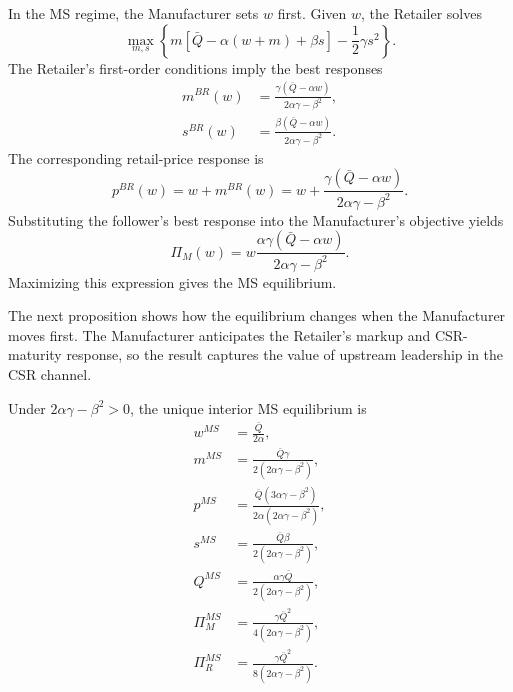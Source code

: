 In the MS regime, the Manufacturer sets $w$ first. Given $w$, the Retailer solves
\begin{equation*}
    \max_{m,s}\left\{m\left[\bar{Q}-\alpha(w+m)+\beta s\right]-\frac12\gamma s^2\right\}.
\end{equation*}
The Retailer's first-order conditions imply the best responses
\begin{align*}
    m^{BR}(w)&=\frac{\gamma(\bar{Q}-\alpha w)}{2\alpha\gamma-\beta^2},\\
    s^{BR}(w)&=\frac{\beta(\bar{Q}-\alpha w)}{2\alpha\gamma-\beta^2}.
\end{align*}
The corresponding retail-price response is
\begin{equation*}
    p^{BR}(w)=w+m^{BR}(w)
    =w+\frac{\gamma(\bar{Q}-\alpha w)}{2\alpha\gamma-\beta^2}.
\end{equation*}
Substituting the follower's best response into the Manufacturer's objective yields
\begin{equation*}
    \Pi_M(w)=w\frac{\alpha\gamma(\bar{Q}-\alpha w)}{2\alpha\gamma-\beta^2}.
\end{equation*}
Maximizing this expression gives the MS equilibrium.

The next proposition shows how the equilibrium changes when the Manufacturer moves first. The Manufacturer anticipates the Retailer's markup and CSR-maturity response, so the result captures the value of upstream leadership in the CSR channel.

\begin{proposition}
\label{prop:ms}
Under $2\alpha\gamma-\beta^2>0$, the unique interior MS equilibrium is
\begin{align*}
    w^{MS} &= \frac{\bar{Q}}{2\alpha},\\
    m^{MS} &= \frac{\bar{Q}\gamma}{2(2\alpha\gamma-\beta^2)},\\
    p^{MS} &= \frac{\bar{Q}(3\alpha\gamma-\beta^2)}{2\alpha(2\alpha\gamma-\beta^2)},\\
    s^{MS} &= \frac{\bar{Q}\beta}{2(2\alpha\gamma-\beta^2)},\\
    Q^{MS} &= \frac{\alpha\gamma\bar{Q}}{2(2\alpha\gamma-\beta^2)},\\
    \Pi_M^{MS} &= \frac{\gamma\bar{Q}^2}{4(2\alpha\gamma-\beta^2)},\\
    \Pi_R^{MS} &= \frac{\gamma\bar{Q}^2}{8(2\alpha\gamma-\beta^2)}.
\end{align*}
\end{proposition}

